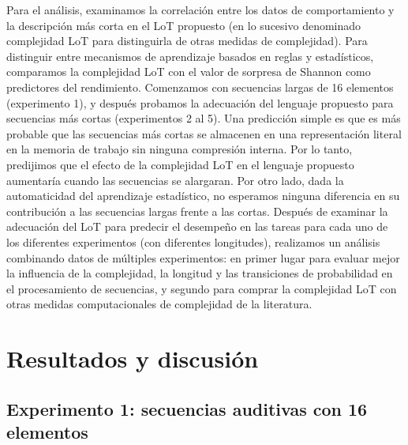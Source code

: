 Para el análisis, examinamos la correlación entre los datos de comportamiento y la descripción más corta en el LoT propuesto (en lo sucesivo denominado complejidad LoT para distinguirla de otras medidas de complejidad). Para distinguir entre mecanismos de aprendizaje basados en reglas y estadísticos, comparamos la complejidad LoT con el valor de sorpresa de Shannon como predictores del rendimiento. Comenzamos con secuencias largas de 16 elementos (experimento 1), y después probamos la adecuación del lenguaje propuesto para secuencias más cortas (experimentos 2 al 5). Una predicción simple es que es más probable que las secuencias más cortas se almacenen en una representación literal en la memoria de trabajo sin ninguna compresión interna. Por lo tanto, predijimos que el efecto de la complejidad LoT en el lenguaje propuesto aumentaría cuando las secuencias se alargaran. Por otro lado, dada la automaticidad del aprendizaje estadístico, no esperamos ninguna diferencia en su contribución a las secuencias largas frente a las cortas. Después de examinar la adecuación del LoT para predecir el desempeño en las tareas para cada uno de los diferentes experimentos (con diferentes longitudes), realizamos un análisis combinando datos de múltiples experimentos: en primer lugar para evaluar mejor la influencia de la complejidad, la longitud y las transiciones de probabilidad en el procesamiento de secuencias, y segundo para comprar la complejidad LoT con otras medidas computacionales de complejidad de la literatura. 

\section{Resultados y discusión}

\subsection{Experimento 1: secuencias auditivas con 16 elementos}

